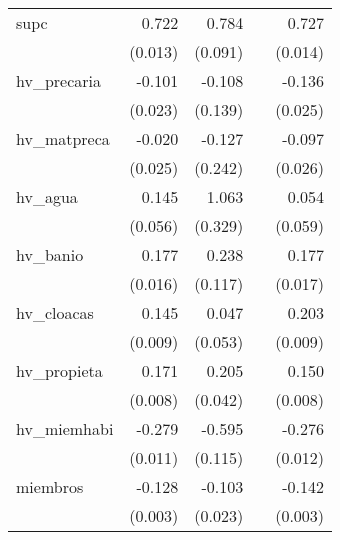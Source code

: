 {\begin{longtable}{l*{4}{D{.}{.}{-1}}}
\addlinespace
supc        &       0.722\sym{***}&       0.784\sym{***}&                     &       0.727\sym{***}\\
            &     (0.013)         &     (0.091)         &                     &     (0.014)         \\
\addlinespace
hv\_precaria &      -0.101\sym{***}&      -0.108         &                     &      -0.136\sym{***}\\
            &     (0.023)         &     (0.139)         &                     &     (0.025)         \\
\addlinespace
hv\_matpreca &      -0.020         &      -0.127         &                     &      -0.097\sym{***}\\
            &     (0.025)         &     (0.242)         &                     &     (0.026)         \\
\addlinespace
hv\_agua     &       0.145\sym{**} &       1.063\sym{**} &                     &       0.054         \\
            &     (0.056)         &     (0.329)         &                     &     (0.059)         \\
\addlinespace
hv\_banio    &       0.177\sym{***}&       0.238\sym{*}  &                     &       0.177\sym{***}\\
            &     (0.016)         &     (0.117)         &                     &     (0.017)         \\
\addlinespace
hv\_cloacas  &       0.145\sym{***}&       0.047         &                     &       0.203\sym{***}\\
            &     (0.009)         &     (0.053)         &                     &     (0.009)         \\
\addlinespace
hv\_propieta &       0.171\sym{***}&       0.205\sym{***}&                     &       0.150\sym{***}\\
            &     (0.008)         &     (0.042)         &                     &     (0.008)         \\
\addlinespace
hv\_miemhabi &      -0.279\sym{***}&      -0.595\sym{***}&                     &      -0.276\sym{***}\\
            &     (0.011)         &     (0.115)         &                     &     (0.012)         \\
\addlinespace
miembros    &      -0.128\sym{***}&      -0.103\sym{***}&                     &      -0.142\sym{***}\\
            &     (0.003)         &     (0.023)         &                     &     (0.003)         \\

\end{longtable}}
